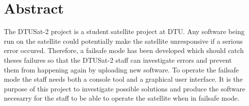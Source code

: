 \chapter{Abstract}

The DTUSat-2 project is a student satellite project at DTU. Any software being run on the satellite could potentially make the satellite unresponsive if a serious error occured. Therefore, a failsafe mode has been developed which should catch theses failures so that the DTUSat-2 staff can investigate errors and prevent them from happening again by uploading new software.
To operate the failsafe mode the staff needs both a console tool and a graphical user interface. It is the purpose of this project to investigate possible solutions and produce the software necesarry for the staff to be able to operate the satellite when in failsafe mode.
